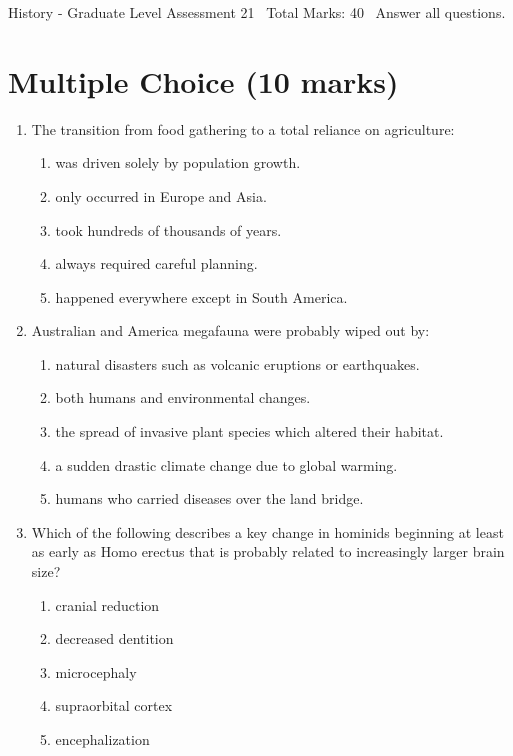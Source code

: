 \documentclass[12pt]{article}
\begin{document}
\begin{center}
History - Graduate Level Assessment 21 \
Total Marks: 40 \
Answer all questions.
\end{center}

\section*{Multiple Choice (10 marks)}
\begin{enumerate}[label=\arabic*.]
\item The transition from food gathering to a total reliance on agriculture:
\begin{enumerate}[label=(\alph*)]
    \item was driven solely by population growth.
    \item only occurred in Europe and Asia.
    \item took hundreds of thousands of years.
    \item always required careful planning.
    \item happened everywhere except in South America.
\end{enumerate}
\item Australian and America megafauna were probably wiped out by:
\begin{enumerate}[label=(\alph*)]
    \item natural disasters such as volcanic eruptions or earthquakes.
    \item both humans and environmental changes.
    \item the spread of invasive plant species which altered their habitat.
    \item a sudden drastic climate change due to global warming.
    \item humans who carried diseases over the land bridge.
\end{enumerate}
\item Which of the following describes a key change in hominids beginning at least as early as Homo erectus that is probably related to increasingly larger brain size?
\begin{enumerate}[label=(\alph*)]
    \item cranial reduction
    \item decreased dentition
    \item microcephaly
    \item supraorbital cortex
    \item encephalization
\end{enumerate}

\end{enumerate}
\end{document}
